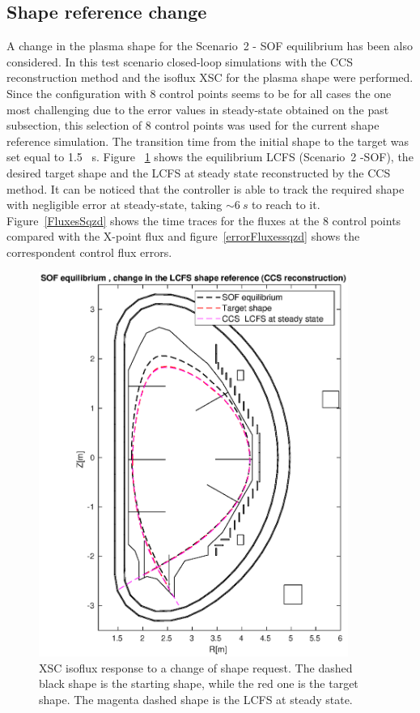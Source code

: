 \subsection{Shape reference change}

A change in the plasma shape for the Scenario~2 - SOF equilibrium has been also considered. In this test scenario closed-loop simulations  with the  CCS reconstruction method and the isoflux XSC for the plasma shape were performed.   Since the configuration with 8 control points seems to be for all cases the one most challenging due to the error values in steady-state obtained on the past subsection, this selection of 8 control points was used for the current shape reference simulation. The transition time from the initial shape to the target was set equal to 1.5 ~s.  Figure ~\ref{sqzd} shows the equilibrium LCFS (Scenario~2 -SOF), the desired target shape and the LCFS at steady state reconstructed by the CCS method. It can be noticed that the controller is able to track the required shape with negligible error at steady-state, taking $\sim 6~ s$ to reach to it. Figure~\ref{FluxesSqzd} shows the time traces for the fluxes at the 8 control points compared with the X-point flux and figure~\ref{errorFluxessqzd} shows the correspondent control flux errors.



\begin{figure}
	\begin{center}
		\includegraphics[width=0.9\textwidth]{Chp3/8gaps_LCFScompar_sqzd.eps}
	\end{center}	
\caption{XSC isoflux response to a change of shape request. The dashed black shape is the starting shape, while the red one is the target shape. The magenta dashed shape is the LCFS at steady state.  }
	\label{sqzd}
\end{figure}



